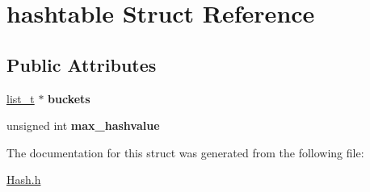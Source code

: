 \hypertarget{structhashtable}{\section{hashtable Struct Reference}
\label{structhashtable}
}
\subsection*{Public Attributes}
\begin{DoxyCompactItemize}
\item 
\hypertarget{structhashtable_aa264dc2cc78d6a2f7304f808723e3a0a}{\hyperlink{structlist}{list\-\_\-t} $\ast$ {\bfseries buckets}}\label{structhashtable_aa264dc2cc78d6a2f7304f808723e3a0a}

\item 
\hypertarget{structhashtable_a4b8681934e1fe89da897e59882b8c2d4}{unsigned int {\bfseries max\-\_\-hashvalue}}\label{structhashtable_a4b8681934e1fe89da897e59882b8c2d4}

\end{DoxyCompactItemize}


The documentation for this struct was generated from the following file\-:\begin{DoxyCompactItemize}
\item 
\hyperlink{Hash_8h}{Hash.\-h}\end{DoxyCompactItemize}
